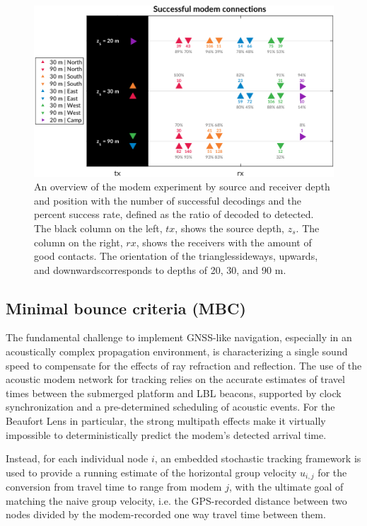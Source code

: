 \begin{figure}[h!]
  \centering
  \includegraphics[width=\textwidth]{figs/modem-chart.pdf}
  \caption{An overview of the modem experiment by source and receiver depth and position with the number of successful decodings and the percent success rate, defined as the ratio of decoded to detected. The black column on the left, $tx$, shows the source depth, $z_s$. The column on the right, $rx$, shows the receivers with the amount of good contacts. The orientation of the triangles\textemdash sideways, upwards, and downwards\textemdash corresponds to depths of 20, 30, and 90 m.}
  \label{fig:overview}
  \end{figure}

\subsection{Minimal bounce criteria (MBC)}

The fundamental challenge to implement GNSS-like navigation, especially in an acoustically complex propagation environment, is characterizing a single sound speed to compensate for the effects of ray refraction and reflection.
The use of the acoustic modem network for tracking relies on the accurate estimates of travel times between the submerged platform and LBL beacons, supported by clock synchronization and a pre-determined scheduling of acoustic events.
 For the Beaufort Lens in particular, the strong multipath effects make it virtually impossible to deterministically predict the modem's detected arrival time.

Instead, for each individual node $i$, an embedded stochastic tracking framework is used to provide a running estimate of the horizontal group velocity $u_{i,j}$ for the conversion from travel time to range from modem $j$, with the ultimate goal of matching the naive group velocity, i.e. the GPS-recorded distance between two nodes divided by the modem-recorded one way travel time between them. 

